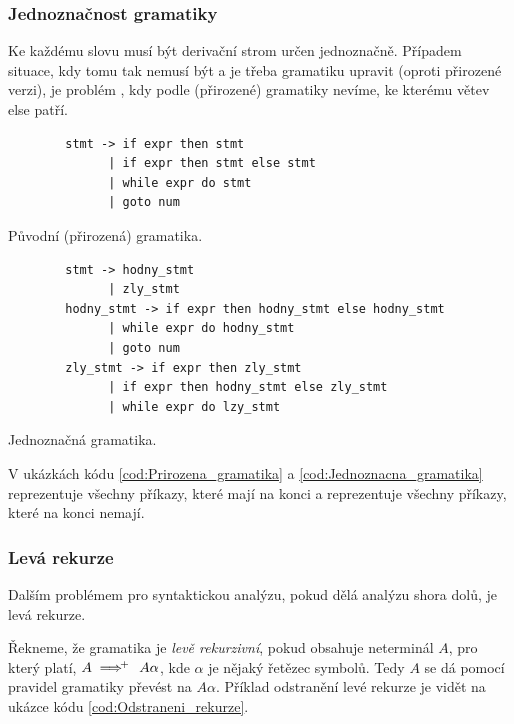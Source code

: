 \subsubsection{Jednoznačnost gramatiky}

Ke každému slovu musí být derivační strom určen jednoznačně. Případem situace, kdy tomu tak nemusí být a je třeba gramatiku upravit (oproti přirozené verzi), je problém , kdy podle (přirozené) gramatiky nevíme, ke kterému  větev else patří.

\begin{kod}[h]
	\begin{verbatim}
		stmt -> if expr then stmt
		      | if expr then stmt else stmt
		      | while expr do stmt
		      | goto num
	\end{verbatim}
	\caption{Původní (přirozená) gramatika.}
	\label{cod:Prirozena_gramatika}
\end{kod}

\begin{kod}[h]
	\begin{verbatim}
		stmt -> hodny_stmt
		      | zly_stmt
		hodny_stmt -> if expr then hodny_stmt else hodny_stmt
		      | while expr do hodny_stmt
		      | goto num
		zly_stmt -> if expr then zly_stmt
		      | if expr then hodny_stmt else zly_stmt
		      | while expr do lzy_stmt
	\end{verbatim}
	\caption{Jednoznačná gramatika.}
	\label{cod:Jednoznacna_gramatika}
\end{kod}

V ukázkách kódu \ref{cod:Prirozena_gramatika} a \ref{cod:Jednoznacna_gramatika}  reprezentuje všechny příkazy, které mají na konci  a  reprezentuje všechny příkazy, které na konci  nemají.


\subsubsection{Levá rekurze}

Dalším problémem pro syntaktickou analýzu, pokud dělá analýzu shora dolů, je levá rekurze.

\begin{definice}
	Řekneme, že gramatika je \emph{levě rekurzivní}, pokud obsahuje neterminál \(A\), pro který platí, \(A \implies \hskip -0.7em ^+ \hskip 0.7em A \alpha\), kde \(\alpha\) je nějaký řetězec symbolů. Tedy \(A\) se dá pomocí pravidel gramatiky převést na \(A\alpha\). Příklad odstranění levé rekurze je vidět na ukázce kódu \ref{cod:Odstraneni_rekurze}.
\end{definice}

